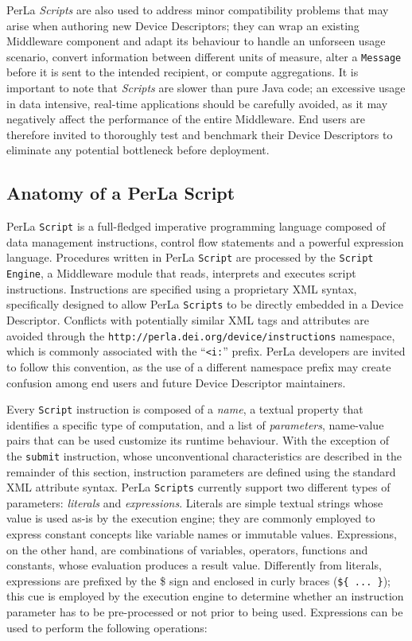 PerLa \textit{Scripts} are also used to address minor compatibility problems
that may arise when authoring new Device Descriptors; they can wrap an existing
Middleware component and adapt its behaviour to handle an unforseen usage
scenario, convert information between different units of measure, alter a
\texttt{Message} before it is sent to the intended recipient, or compute
aggregations. It is important to note that \textit{Scripts} are slower than
pure Java code; an excessive usage in data intensive, real-time applications
should be carefully avoided, as it may negatively affect the performance of the
entire Middleware. End users are therefore invited to thoroughly test and
benchmark their Device Descriptors to eliminate any potential bottleneck before
deployment.


\subsection{Anatomy of a PerLa Script}

PerLa \texttt{Script} is a full-fledged imperative programming language
composed of data management instructions, control flow statements and a
powerful expression language. Procedures written in PerLa \texttt{Script} are
processed by the \texttt{Script Engine}, a Middleware module that reads,
interprets and executes script instructions. Instructions are specified using a
proprietary XML syntax, specifically designed to allow PerLa \texttt{Scripts}
to be directly embedded in a Device Descriptor. Conflicts with potentially
similar XML tags and attributes are avoided through the
\texttt{http://perla.dei.org/device/instructions} namespace, which is commonly
associated with the ``\texttt{<i:}'' prefix. PerLa developers are invited to
follow this convention, as the use of a different namespace prefix may create
confusion among end users and future Device Descriptor maintainers. 

Every \texttt{Script} instruction is composed of a \textit{name}, a textual
property that identifies a specific type of computation, and a list of
\textit{parameters}, name-value pairs that can be used customize its runtime
behaviour. With the exception of the \texttt{submit} instruction, whose
unconventional characteristics are described in the remainder of this section,
instruction parameters are defined using the standard XML attribute syntax.
PerLa \texttt{Scripts} currently support two different types of parameters:
\textit{literals} and \textit{expressions}. Literals are simple textual strings
whose value is used as-is by the execution engine; they are commonly employed
to express constant concepts like variable names or immutable values.
Expressions, on the other hand, are combinations of variables, operators,
functions and constants, whose evaluation produces a result value. Differently
from literals, expressions are prefixed by the \$ sign and enclosed in curly
braces (\lstinline!${ ... }!); this cue is employed by the execution engine to
determine whether an instruction parameter has to be pre-processed or not prior
to being used. Expressions can be used to perform the following operations:

